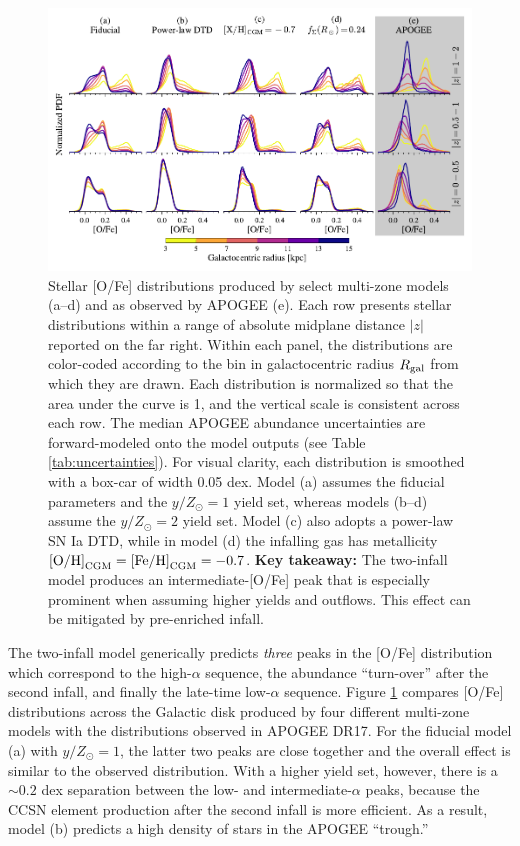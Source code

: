 \documentclass[twocolumn,twocolappendix,linenumbers]{aastex631}
\newcommand{\mathOH}{{\rm [O/H]}}
\newcommand{\mathFeH}{{\rm [Fe/H]}}
\newcommand{\yZ}[1]{$y/Z_\odot=#1$}
\begin{document}
\begin{figure}
    \centering
    \includegraphics{src/tex/figures/ofe_distribution_params.pdf}
    \caption{Stellar [O/Fe] distributions produced by select multi-zone models (a--d) and as observed by APOGEE (e). Each row presents stellar distributions within a range of absolute midplane distance $|z|$ reported on the far right. Within each panel, the distributions are color-coded according to the bin in galactocentric radius $R_{\rm gal}$ from which they are drawn. Each distribution is normalized so that the area under the curve is 1, and the vertical scale is consistent across each row. The median APOGEE abundance uncertainties are forward-modeled onto the model outputs (see Table \ref{tab:uncertainties}). For visual clarity, each distribution is smoothed with a box-car of width 0.05 dex. Model (a) assumes the fiducial parameters and the \yZ{1} yield set, whereas models (b--d) assume the \yZ{2} yield set. Model (c) also adopts a power-law SN Ia DTD, while in model (d) the infalling gas has metallicity $\mathOH_{\rm CGM}=\mathFeH_{\rm CGM}=-0.7$. {\bf Key takeaway:} The two-infall model produces an intermediate-[O/Fe] peak that is especially prominent when assuming higher yields and outflows. This effect can be mitigated by pre-enriched infall.}
    \label{fig:ofe-df}
\end{figure}

The two-infall model generically predicts {\it three} peaks in the [O/Fe] distribution which correspond to the high-$\alpha$ sequence, the abundance ``turn-over'' after the second infall, and finally the late-time low-$\alpha$ sequence. Figure \ref{fig:ofe-df} compares [O/Fe] distributions across the Galactic disk produced by four different multi-zone models with the distributions observed in APOGEE DR17. For the fiducial model (a) with $y/Z_\odot=1$, the latter two peaks are close together and the overall effect is similar to the observed distribution. With a higher yield set, however, there is a $\sim0.2$ dex separation between the low- and intermediate-$\alpha$ peaks, because the CCSN element production after the second infall is more efficient. As a result, model (b) predicts a high density of stars in the APOGEE ``trough.''
\end{document}
